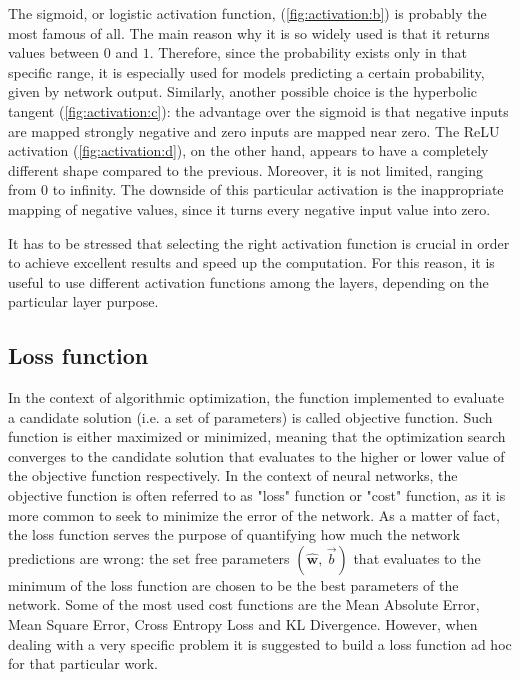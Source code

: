 The sigmoid, or logistic activation function, (\autoref{fig:activation:b}) is probably the most famous of all. The main
reason why it is so widely used is that it returns values between $0$ and $1$. Therefore, since the probability
exists only in that specific range, it is especially used for models predicting a certain probability, given by network
output. Similarly, another possible choice is the hyperbolic tangent (\autoref{fig:activation:c}): the advantage over
the sigmoid is that negative inputs are mapped strongly negative and zero inputs are mapped near zero. The ReLU
activation (\autoref{fig:activation:d}), on the other hand, appears to have a completely different shape compared to the
previous. Moreover, it is not limited, ranging from $0$ to infinity. The downside of this particular activation is the
inappropriate mapping of negative values, since it turns every negative input value into zero. 

It has to be stressed that selecting the right activation function is crucial in order to achieve excellent results and speed
up the computation. For this reason, it is useful to use different activation functions among the layers, depending on
the particular layer purpose.

\subsection{Loss function}

In the context of algorithmic optimization, the function implemented to evaluate a candidate solution (i.e. a set of
parameters) is called objective function. Such function is either maximized or minimized, meaning that the optimization
search converges to the candidate solution that evaluates to the higher or lower value of the objective function
respectively. In the context of neural networks, the objective function is often referred to as "loss" function or
"cost" function, as it is more common to seek to minimize the error of the network. As a matter of fact, the loss
function serves the purpose of quantifying how much the network predictions are wrong: the set free parameters
$(\hat{\mathbf{w}},\,\vec{b})$ that evaluates to the minimum of the loss function are chosen to be the best parameters
of the network. Some of the most used cost functions are the Mean Absolute Error, Mean Square Error, Cross Entropy Loss
and KL Divergence. However, when dealing with a very specific problem it is suggested to build a loss function ad hoc
for that particular work. 